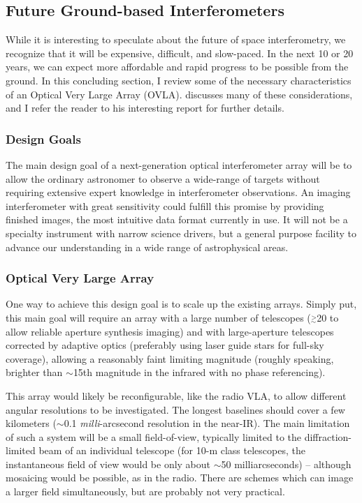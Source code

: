 \documentclass[12pt]{iopart}
\newcommand{\simge}{\mbox{$\stackrel{>}{_{\sim}}$}}
\begin{document}
\subsection{Future Ground-based Interferometers}

While it is interesting to speculate about the future of space
interferometry, we recognize that it will be expensive, difficult, and
slow-paced.  In the next 10 or 20 years, we can expect more affordable
and rapid progress to be possible from the ground.  In this concluding
section, I review some of the necessary characteristics of an Optical
Very Large Array (OVLA).  \citet{ridgway2000} discusses many of these
considerations, and I refer the reader to his interesting report for 
further details.

\subsubsection{Design Goals}
The main design goal of a next-generation optical interferometer array
will be to allow the ordinary astronomer to observe a wide-range of
targets without requiring extensive expert knowledge in interferometer
observations.  An imaging interferometer with great sensitivity could
fulfill this promise by providing finished images, the most intuitive
data format currently in use. It will not be a specialty instrument
with narrow science drivers, but a general purpose facility to advance
our understanding in a wide range of astrophysical areas.

\subsubsection{Optical Very Large Array}
One way to achieve this design goal is to scale up the existing
arrays.  Simply put, this main goal will require an array with a large
number of telescopes ($\simge$20 to allow reliable aperture synthesis
imaging) and with large-aperture telescopes corrected by adaptive
optics (preferably using laser guide stars for full-sky coverage),
allowing a reasonably faint limiting magnitude (roughly speaking,
brighter than $\sim$15th magnitude in the infrared with no phase
referencing).

This array would likely be reconfigurable, like the radio VLA, to
allow different angular resolutions to be investigated. The longest
baselines should cover a few kilometers ($\sim$0.1 {\em
  milli}-arcsecond resolution in the near-IR).  The main limitation of
such a system will be a small field-of-view, typically limited to the
diffraction-limited beam of an individual telescope (for 10-m class
telescopes, the instantaneous field of view would be only about
$\sim$50 milliarcseconds) -- although mosaicing would be possible, as
in the radio.  There are schemes which can image a larger field
simultaneously, but are probably not very practical.
\end{document}
